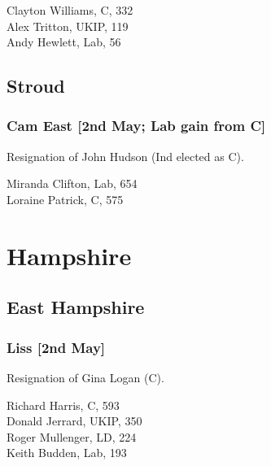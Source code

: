 \documentclass[a4paper,openany,10pt]{book}
\begin{document}
Clayton Williams, C, 332\\
Alex Tritton, UKIP, 119\\
Andy Hewlett, Lab, 56\\


\subsection*{Stroud}

\subsubsection*{Cam East \hspace*{\fill}\nolinebreak[1]%
\enspace\hspace*{\fill}
[2nd May; Lab gain from C]}


Resignation of John Hudson (Ind elected as C).



Miranda Clifton, Lab, 654\\
Loraine Patrick, C, 575\\


\vfill

\section{Hampshire}

\subsection*{East Hampshire}

\subsubsection*{Liss \hspace*{\fill}\nolinebreak[1]%
\enspace\hspace*{\fill}
[2nd May]}


Resignation of Gina Logan (C).



Richard Harris, C, 593\\
Donald Jerrard, UKIP, 350\\
Roger Mullenger, LD, 224\\
Keith Budden, Lab, 193\\
\end{document}
